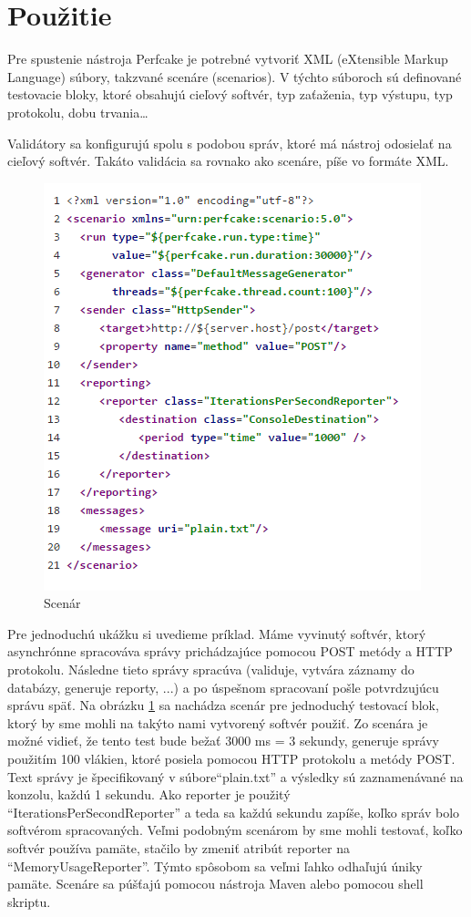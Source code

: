 \section{Použitie}

Pre spustenie nástroja Perfcake je potrebné vytvoriť XML (eXtensible Markup Language) súbory, takzvané scenáre (scenarios). V týchto súboroch sú definované testovacie bloky, ktoré obsahujú cieľový softvér, typ zaťaženia, typ výstupu, typ protokolu, dobu trvania\dots

Validátory sa konfigurujú spolu s podobou správ, ktoré má nástroj odosielať na cieľový softvér. Takáto validácia sa rovnako ako scenáre, píše vo formáte XML.


\begin{figure}[ht]
\includegraphics[scale=1]{scenario.png}
\caption{Scenár}\label{scenario}
\end{figure}


Pre jednoduchú ukážku si uvedieme príklad. Máme vyvinutý softvér, ktorý asynchrónne spracováva správy prichádzajúce pomocou POST metódy a HTTP protokolu. Následne tieto správy spracúva (validuje, vytvára záznamy do databázy, generuje reporty, ...) a po úspešnom spracovaní pošle potvrdzujúcu správu späť.
Na obrázku \ref{scenario} sa nachádza scenár pre jednoduchý testovací blok, ktorý by sme mohli na takýto nami vytvorený softvér použiť. Zo scenára je možné vidieť, že tento test bude bežať 3000 ms = 3 sekundy, generuje správy použitím 100 vlákien, ktoré posiela pomocou HTTP protokolu a metódy POST. Text správy je špecifikovaný v súbore``plain.txt'' a výsledky sú zaznamenávané na konzolu, každú 1 sekundu. Ako reporter je použitý ``IterationsPerSecondReporter'' a teda sa každú sekundu zapíše, koľko správ bolo softvérom spracovaných. Veľmi podobným scenárom by sme mohli testovať, koľko softvér používa pamäte, stačilo by zmeniť atribút reporter na ``MemoryUsageReporter''. Týmto spôsobom sa veľmi ľahko odhaľujú úniky pamäte. Scenáre sa púšťajú pomocou nástroja Maven alebo pomocou shell skriptu.


